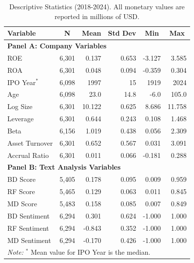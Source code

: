 \begin{table}[ht]
\centering
\renewcommand{\arraystretch}{1.0}
\setlength{\tabcolsep}{10pt}
\caption{Descriptive Statistics (2018-2024). All monetary values are reported in millions of USD.}
\label{tab:desc_stats_full}
\begin{tabular}{lrrrrr}
\toprule
Variable & \multicolumn{1}{c}{N} & \multicolumn{1}{c}{Mean} & \multicolumn{1}{c}{Std Dev} & \multicolumn{1}{c}{Min} & \multicolumn{1}{c}{Max} \\
\midrule
\multicolumn{6}{l}{\textbf{Panel A: Company Variables}} \\
\hspace{1em} ROE & 6,301 & 0.137 & 0.653 & -3.127 & 3.585 \\
\hspace{1em} ROA & 6,301 & 0.048 & 0.094 & -0.359 & 0.304 \\
\hspace{1em} IPO Year$^{*}$ & 6,098 & 1997 & 15 & 1919 & 2024 \\
\hspace{1em} Age & 6,098 & 23.0 & 14.8 & -6.0 & 105.0 \\
\hspace{1em} Log Size & 6,301 & 10.122 & 0.625 & 8.686 & 11.758 \\
\hspace{1em} Leverage & 6,301 & 0.644 & 0.243 & 0.108 & 1.468 \\
\hspace{1em} Beta & 6,156 & 1.019 & 0.438 & 0.056 & 2.309 \\
\hspace{1em} Asset Turnover & 6,301 & 0.652 & 0.567 & 0.031 & 3.091 \\
\hspace{1em} Accrual Ratio & 6,301 & 0.011 & 0.066 & -0.181 & 0.288 \\
\midrule
\multicolumn{6}{l}{\textbf{Panel B: Text Analysis Variables}} \\
\hspace{1em} BD Score & 5,405 & 0.178 & 0.095 & 0.009 & 0.959 \\
\hspace{1em} RF Score & 5,465 & 0.129 & 0.063 & 0.011 & 0.845 \\
\hspace{1em} MD Score & 5,483 & 0.158 & 0.085 & 0.007 & 0.849 \\
\hspace{1em} BD Sentiment & 6,294 & 0.301 & 0.624 & -1.000 & 1.000 \\
\hspace{1em} RF Sentiment & 6,294 & -0.843 & 0.352 & -1.000 & 1.000 \\
\hspace{1em} MD Sentiment & 6,294 & -0.170 & 0.426 & -1.000 & 1.000 \\
\midrule
\multicolumn{6}{l}{\footnotesize \textit{Note:} $^{*}$ Mean value for IPO Year is the median.} \\
\bottomrule
\end{tabular}
\end{table}